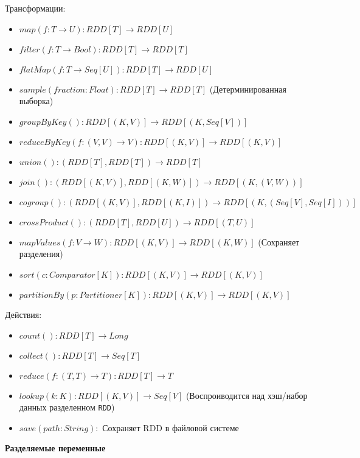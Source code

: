 Трансформации: 
\begin{itemize}
  \item $map( f : T \rightarrow U) : RDD[T] \rightarrow RDD[U]$  
  \item $filter( f : T \rightarrow Bool) : RDD[T] \rightarrow RDD[T]$ 
  \item $flatMap( f : T \rightarrow Seq[U]) : RDD[T] \rightarrow RDD[U]$
  \item $sample(fraction : Float) : RDD[T] \rightarrow RDD[T]$ (Детерминированная выборка) 
  \item $groupByKey() : RDD[(K, V)] \rightarrow RDD[(K, Seq[V])]$ 
  \item $reduceByKey( f : (V, V) \rightarrow V) : RDD[(K, V)] \rightarrow RDD[(K, V)]$ 
  \item $union() : (RDD[T], RDD[T]) \rightarrow RDD[T]$ 
  \item $join() : (RDD[(K, V)], RDD[(K, W)]) \rightarrow RDD[(K, (V, W))]$ 
  \item $cogroup() : (RDD[(K, V)],RDD[(K, I)]) \rightarrow RDD[(K, (Seq[V],Seq[I]))]$ 
  \item $crossProduct() : (RDD[T], RDD[U]) \rightarrow RDD[(T, U)]$ 
  \item $mapValues( f : V \rightarrow W) : RDD[(K, V)] \rightarrow RDD[(K, W)]$ (Сохраняет разделения) 
  \item $sort(c : Comparator[K]) : RDD[(K, V)] \rightarrow RDD[(K, V)]$ 
  \item $partitionBy(p : Partitioner[K]) : RDD[(K, V)] \rightarrow RDD[(K, V)]$ 
\end{itemize}

Действия:
\begin{itemize}
  \item $count() : RDD[T] \rightarrow Long$
  \item $collect() : RDD[T] \rightarrow Seq[T]$
  \item $reduce( f : (T, T) \rightarrow T) : RDD[T] \rightarrow T$
  \item $lookup(k : K) : RDD[(K, V)] \rightarrow Seq[V]$ (Воспроиводится над хэш/набор данных разделенном \texttt{RDD})
  \item $save(path : String) : $ Сохраняет RDD в файловой системе
\end{itemize}

\textbf{Разделяемые переменные}

